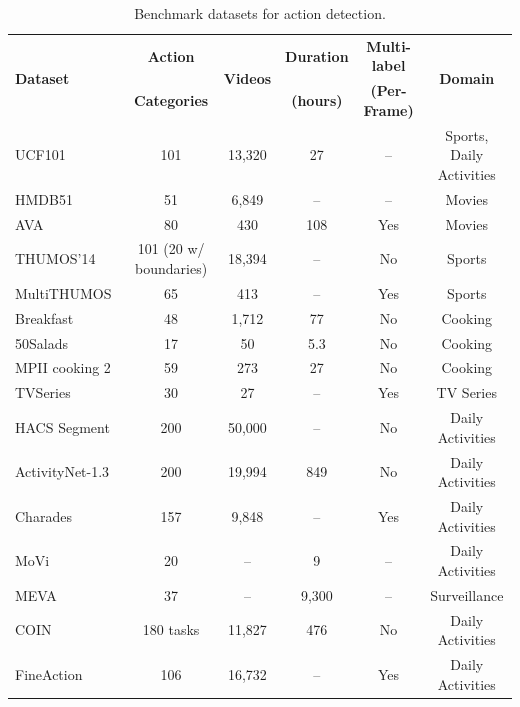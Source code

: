\begin{table}[!t]
\centering
\caption{Benchmark datasets for action detection.}
\label{tab:action_detection_dataset}
\fontsize{9}{11}\selectfont
\setlength{\tabcolsep}{5.5pt}
\begin{tabular}{lccccc}
\toprule
\multirow{2}{*}{\textbf{Dataset}} & \textbf{Action} & \multirow{2}{*}{\textbf{Videos}} & \textbf{Duration} & \textbf{Multi-label} & \multirow{2}{*}{\textbf{Domain}} \\
& \textbf{Categories} & & \textbf{(hours)} & \textbf{(Per-Frame)} & \\
\midrule
UCF101~\cite{soomro2012ucf101}           & 101  & 13,320 & 27 & --  & Sports, Daily Activities\\
HMDB51~\cite{kuehne2011hmdb}           & 51   & 6,849  & -- & --  & Movies \\
AVA~\cite{gu2018ava}              & 80   & 430    & 108 & Yes & Movies \\
THUMOS'14~\cite{jiang2014thumos}        & 101 (20 w/ boundaries)  & 18,394 & --  & No & Sports \\
MultiTHUMOS~\cite{yeung2018every}  & 65                         & 413             & --                       & Yes         & Sports                 \\
Breakfast~\cite{kuehne2014language}    & 48                         & 1,712           & 77                    & No          & Cooking                \\
50Salads~\cite{stein2013combining}     & 17                         & 50              & 5.3                       & No          & Cooking                \\
MPII cooking 2~\cite{rohrbach2016recognizing} & 59                        & 273             & 27          & No          & Cooking                \\
TVSeries~\cite{de2016online}     & 30                         & 27              & --                   & Yes         & TV Series              \\
HACS Segment~\cite{zhao2019hacs} & 200                        & 50,000             & --                       & No          & Daily Activities       \\
ActivityNet-1.3~\cite{caba2015activitynet}  & 200  & 19,994 & 849   & No & Daily Activities \\
Charades~\cite{sigurdsson2016hollywood}         & 157  & 9,848  & --    & Yes         & Daily Activities \\
MoVi~\cite{ghorbani2021movi}             & 20   & --     & 9    & -- & Daily Activities \\
MEVA~\cite{corona2021meva}             & 37   & --     & 9,300  & -- & Surveillance \\
COIN~\cite{tang2019coin}         & 180 tasks                  & 11,827          & 476                       & No          & Daily Activities       \\
FineAction~\cite{liu2022fineaction}      & 106  & 16,732 & --    & Yes         & Daily Activities \\
\bottomrule
\end{tabular}
\end{table}

